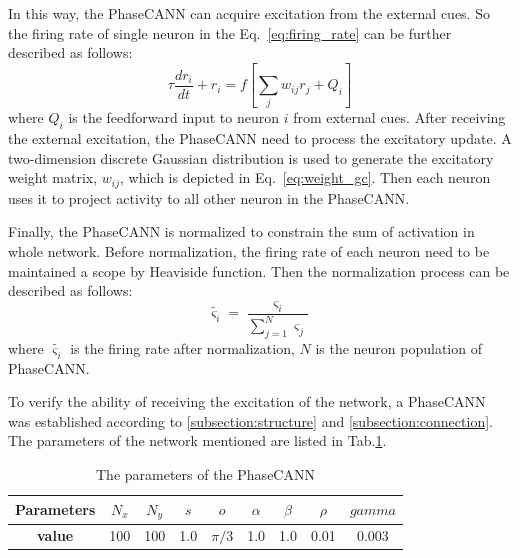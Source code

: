 \documentclass[preprint,12pt]{elsarticle}
\begin{document}
In this way, the PhaseCANN can acquire excitation from the external cues. So the firing rate of single neuron in the Eq.~\eqref{eq:firing_rate} can be further described as follows:
\begin{equation}\label{eq:firing_rate_modify}
	\tau \frac{d r_{i}}{d t}+r_{i}=f\left[\sum_{j} w_{i j} r_{j} + Q_i\right]
\end{equation}
where $Q_i$ is the feedforward input to neuron $i$ from external cues. After receiving the external excitation, the PhaseCANN need to process the excitatory update. A two-dimension discrete Gaussian distribution is used to generate the excitatory weight matrix, $w_{ij}$, which is depicted in Eq.~\eqref{eq:weight_gc}. Then each neuron uses it to project activity to all other neuron in the PhaseCANN.

Finally, the PhaseCANN is normalized to constrain the sum of activation in whole network. Before normalization, the firing rate of each neuron need to be maintained a scope by Heaviside function. Then the normalization process can be described as follows:
\begin{equation}\label{eq:normalization}
	\tilde{\varsigma_i} = \frac{\varsigma_i}{\sum_{j=1}^{N} \varsigma_j}
\end{equation}
where $\tilde{\varsigma_i}$ is the firing rate after normalization, $N$ is the neuron population of PhaseCANN.



To verify the ability of receiving the excitation of the network, a PhaseCANN was established according to \ref{subsection:structure} and \ref{subsection:connection}. The parameters of the network mentioned are listed in Tab.\ref{tab:model_parameter}.

\begin{table}[h]
	\centering
	\caption{The parameters of the PhaseCANN}
	\label{tab:model_parameter}
	\begin{tabular}{c c c c c c c c c }		
		\toprule
		\textbf{Parameters}&$N_x$& $N_y$&$s$ &$o$ &$\alpha$ &$\beta$ &$\rho$ &$gamma$ \\
		\midrule
		\textbf{value}&100&100&1.0&$\pi/3$&1.0&1.0&0.01&0.003\\
		\bottomrule
	\end{tabular}
\end{table}
\end{document}
